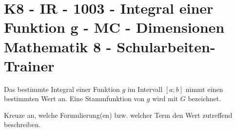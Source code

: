 \section{K8 - IR - 1003 - Integral einer Funktion g - MC - Dimensionen Mathematik 8 - Schularbeiten-Trainer}

\begin{beispiel}[K8 - IR]{1}
Das bestimmte Integral einer Funktion $g$ im Intervall $[a;b]$ nimmt einen bestimmten Wert an. Eine Stammfunktion von $g$ wird mit $G$ bezeichnet.

Kreuze an, welche Formulierung(en) bzw. welcher Term den Wert zutreffend beschreiben.

\end{beispiel}